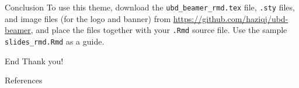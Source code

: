 \documentclass[,aspectratio=43]{beamer}
\begin{document}
\begin{frame}[fragile]{Conclusion}
\protect\hypertarget{conclusion-1}{}
To use this theme, download the \texttt{ubd\_beamer\_rmd.tex} file,
\texttt{.sty} files, and image files (for the logo and banner) from
\url{https://github.com/haziqj/ubd-beamer}, and place the files together
with your \texttt{.Rmd} source file. Use the sample
\texttt{slides\_rmd.Rmd} as a guide.
\end{frame}

\begin{frame}{End}
	\centering
	\Huge
  \textcolor{ubdblue}{Thank you!}
\end{frame}

\begin{frame}{References}
	\printbibliography[heading=none]
\end{frame}
\end{document}

